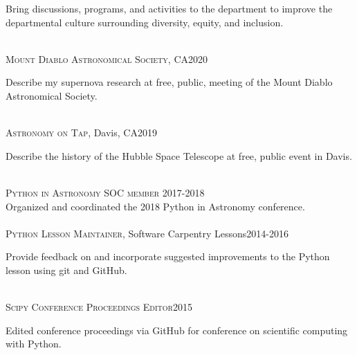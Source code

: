 \documentclass[10pt]{cv}
\begin{document}
\begin{llist}
\begin{minipage}[l]{0.7\textwidth}\vspace{0.15cm}
Bring discussions, programs, and activities to the department to improve the departmental culture surrounding diversity, equity, and inclusion.\\
\end{minipage}\vspace{0.15cm}
\\
\textsc{Mount Diablo Astronomical Society}, CA\hfill 2020\\
\begin{minipage}[l]{0.7\textwidth}\vspace{0.15cm}
Describe my supernova research at free, public, meeting of the Mount Diablo Astronomical Society.\\
\end{minipage}\vspace{0.15cm}
\\
\textsc{Astronomy on Tap}, Davis, CA\hfill 2019\\
\begin{minipage}[l]{0.7\textwidth}\vspace{0.15cm}
Describe the history of the Hubble Space Telescope at free, public event in Davis.\\
\end{minipage}\vspace{0.15cm}
%
\\
\textsc{Python in Astronomy SOC member} \hfill 2017-2018\\
Organized and coordinated the 2018 Python in Astronomy conference.\\
\\
\textsc{Python Lesson Maintainer}, Software Carpentry Lessons\hfill 2014-2016\\
\begin{minipage}[l]{0.7\textwidth}\vspace{0.15cm}
Provide feedback on and incorporate suggested improvements to the Python lesson using git and GitHub.\\
\end{minipage}\vspace{0.15cm}
\\
\textsc{Scipy Conference Proceedings Editor}\hfill 2015\\
\begin{minipage}[l]{0.7\textwidth}\vspace{0.15cm}
Edited conference proceedings via GitHub for conference on scientific computing with Python.\\

\end{minipage}
\end{llist}
\end{document}
